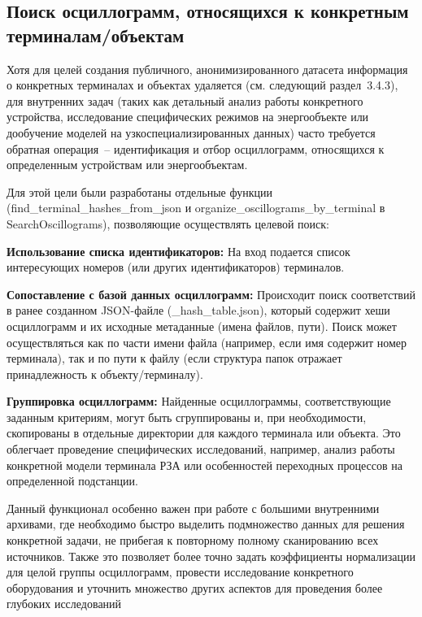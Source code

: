 \subsection{Поиск осциллограмм, относящихся к конкретным терминалам/объектам}\label{sec:ch3_terminal_search}

Хотя для целей создания публичного, анонимизированного датасета информация о конкретных терминалах и объектах удаляется (см. следующий раздел~3.4.3), для внутренних задач (таких как детальный анализ работы конкретного устройства, исследование специфических режимов на энергообъекте или дообучение моделей на узкоспециализированных данных) часто требуется обратная операция~-- идентификация и отбор осциллограмм, относящихся к определенным устройствам или энергообъектам.\par\vspace{0.2cm}

Для этой цели были разработаны отдельные функции (find\_terminal\_hashes\_from\_json и organize\_oscillograms\_by\_terminal в SearchOscillograms), позволяющие осуществлять целевой поиск:\par\vspace{0.2cm}

\textbf{Использование списка идентификаторов:} На вход подается список интересующих номеров (или других идентификаторов) терминалов.\par\vspace{0.2cm}

\textbf{Сопоставление с базой данных осциллограмм:} Происходит поиск соответствий в ранее созданном JSON-файле (\_hash\_table.json), который содержит хеши осциллограмм и их исходные метаданные (имена файлов, пути). Поиск может осуществляться как по части имени файла (например, если имя содержит номер терминала), так и по пути к файлу (если структура папок отражает принадлежность к объекту/терминалу).\par\vspace{0.2cm}

\textbf{Группировка осциллограмм:} Найденные осциллограммы, соответствующие заданным критериям, могут быть сгруппированы и, при необходимости, скопированы в отдельные директории для каждого терминала или объекта. Это облегчает проведение специфических исследований, например, анализ работы конкретной модели терминала РЗА или особенностей переходных процессов на определенной подстанции.\par\vspace{0.2cm}

Данный функционал особенно важен при работе с большими внутренними архивами, где необходимо быстро выделить подмножество данных для решения конкретной задачи, не прибегая к повторному полному сканированию всех источников. Также это позволяет более точно задать коэффициенты нормализации для целой группы осциллограмм, провести исследование конкретного оборудования и уточнить множество других аспектов для проведения более глубоких исследований\par\vspace{0.2cm}


